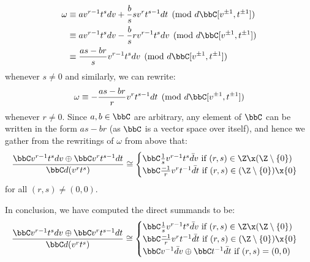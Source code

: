 \begin{example}
\begin{itemize}
                    $$
                        \begin{aligned}
                            \omega & \equiv a v^{r - 1} t^s dv + \frac{b}{s} s v^r t^{s - 1} dt \pmod{d\bbC[v^{\pm 1}, t^{\pm 1}]}
                            \\
                            & \equiv a v^{r - 1} t^s dv - \frac{b}{s} r v^{r - 1} t^s dv \pmod{d\bbC[v^{\pm 1}, t^{\pm 1}]}
                            \\
                            & \equiv \frac{as - br}{s} v^{r - 1} t^s dv \pmod{d\bbC[v^{\pm 1}, t^{\pm 1}]}
                        \end{aligned}
                    $$
                whenever $s \not = 0$ and similarly, we can rewrite:
                    $$\omega \equiv -\frac{as - br}{r} v^r t^{s - 1} dt \pmod{d\bbC[v^{\pm 1}, t^{\pm 1}]}$$
                whenever $r \not = 0$. Since $a, b \in \bbC$ are arbitrary, any element of $\bbC$ can be written in the form $as - br$ (as $\bbC$ is a vector space over itself), and hence we gather from the rewritings of $\omega$ from above that:
                    $$
                        \frac{ \bbC v^{r - 1} t^s dv \oplus \bbC v^r t^{s - 1} dt }{ \bbC d(v^r t^s) } \cong
                        \begin{cases}
                            \text{$\bbC \frac1s v^{r - 1} t^s \bar{d}v$ if $(r, s) \in \Z \x (\Z \setminus \{0\})$}
                            \\
                            \text{$\bbC \frac{-1}{r} v^r t^{-1} \bar{d}t$ if $(r, s) \in (\Z \setminus \{0\}) \x \{0\}$}
                        \end{cases}
                    $$
                for all $(r, s) \not = (0, 0)$.
            \end{itemize}
            In conclusion, we have computed the direct summands to be:
                $$
                    \frac{ \bbC v^{r - 1} t^s dv \oplus \bbC v^r t^{s - 1} dt }{ \bbC d(v^r t^s) } \cong 
                    \begin{cases}
                        \text{$\bbC \frac1s v^{r - 1} t^s \bar{d}v$ if $(r, s) \in \Z \x (\Z \setminus \{0\})$}
                        \\
                        \text{$\bbC \frac{-1}{r} v^r t^{-1} \bar{d}t$ if $(r, s) \in (\Z \setminus \{0\}) \x \{0\}$}
                        \\
                        \text{$\bbC v^{-1}\bar{d}v \oplus \bbC t^{-1} \bar{d}t$ if $(r, s) = (0, 0)$}
                    \end{cases}
$$
\end{example}
